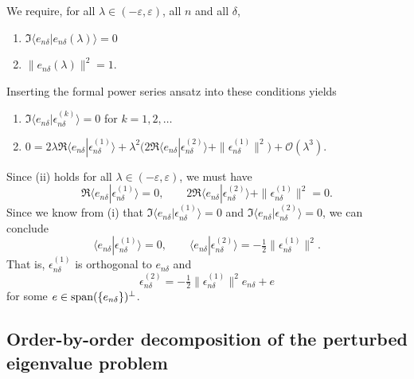 We require, for all $\lambda\in(-\varepsilon,\varepsilon)$, all $n$ and all $\delta$,
\begin{enumerate}[label=(\roman*)]
\item $\Im\langle e_{n\delta}|e_{n\delta}(\lambda)\rangle = 0$
\item $\|e_{n\delta}(\lambda)\|^2=1$.
\end{enumerate}
Inserting the formal power series ansatz into these conditions yields
\begin{enumerate}[label=(\roman*)]
\item $\Im\langle e_{n\delta}|\epsilon^{(k)}_{n\delta}\rangle = 0$ for $k=1,2,\ldots$
\item $0 = 2\lambda\Re\langle e_{n\delta}|\epsilon^{(1)}_{n\delta}\rangle +\lambda^2\bigl(2\Re\langle e_{n\delta}|\epsilon^{(2)}_{n\delta}\rangle +\|\epsilon^{(1)}_{n\delta}\|^2\bigr)+ \mathcal{O}(\lambda^3)$.
\end{enumerate}
Since (ii) holds for all $\lambda\in(-\varepsilon,\varepsilon)$, we must have 
\begin{equation*}
\Re\langle e_{n\delta}|\epsilon^{(1)}_{n\delta}\rangle=0, \qquad 2\Re\langle e_{n\delta}|\epsilon^{(2)}_{n\delta}\rangle +\|\epsilon^{(1)}_{n\delta}\|^2=0. 
\end{equation*}
Since we know from (i) that $\Im\langle e_{n\delta}|\epsilon^{(1)}_{n\delta}\rangle = 0$ and $\Im\langle e_{n\delta}|\epsilon^{(2)}_{n\delta}\rangle = 0$, we can conclude
\begin{equation*}
\langle e_{n\delta}|\epsilon^{(1)}_{n\delta}\rangle=0, \qquad  \langle e_{n\delta}|\epsilon^{(2)}_{n\delta}\rangle =-\tfrac{1}{2}\|\epsilon^{(1)}_{n\delta}\|^2. 
\end{equation*}
That is, $\epsilon^{(1)}_{n\delta}$ is orthogonal to $e_{n\delta}$ and
\begin{equation*}
\epsilon^{(2)}_{n\delta} = -\tfrac{1}{2}\|\epsilon^{(1)}_{n\delta}\|^2e_{n\delta} + e
\end{equation*}
for some $e\in \operatorname{span}(\{e_{n\delta}\})^{\perp}$.

\subsection{Order-by-order decomposition of the perturbed eigenvalue problem}

